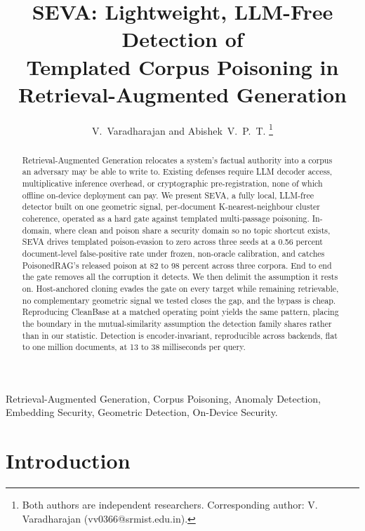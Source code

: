 \documentclass[10pt,journal,compsoc]{IEEEtran}
\begin{document}
\title{SEVA: Lightweight, LLM-Free Detection of\\
Templated Corpus Poisoning in\\
Retrieval-Augmented Generation}

\author{V.~Varadharajan and Abishek~V.~P.~T.%
\thanks{Both authors are independent researchers. Corresponding author: V. Varadharajan (vv0366@srmist.edu.in).}}

\maketitle

\begin{abstract}
Retrieval-Augmented Generation relocates a system's factual authority into a corpus an
adversary may be able to write to. Existing defenses require
LLM decoder access, multiplicative inference overhead, or cryptographic
pre-registration, none of which offline on-device deployment can pay. We present SEVA,
a fully local, LLM-free detector built on one geometric signal, per-document
K-nearest-neighbour cluster coherence, operated as a hard gate against templated
multi-passage poisoning. In-domain, where clean and poison share a security domain so
no topic shortcut exists, SEVA drives templated poison-evasion to zero across three
seeds at a 0.56 percent document-level false-positive rate under frozen, non-oracle
calibration, and catches PoisonedRAG's released poison at 82 to 98 percent across three
corpora. End to end the gate removes all the corruption it detects. We then delimit the
assumption it rests on. Host-anchored cloning evades the gate on every target while
remaining retrievable, no complementary geometric signal we tested closes the gap, and
the bypass is cheap. Reproducing CleanBase at a matched operating point yields
the same pattern, placing the boundary in the mutual-similarity assumption the
detection family shares rather than in our statistic. Detection is encoder-invariant,
reproducible across backends, flat to one million documents, at 13 to 38 milliseconds
per query.
\end{abstract}

\begin{IEEEkeywords}
Retrieval-Augmented Generation, Corpus Poisoning, Anomaly Detection, Embedding
Security, Geometric Detection, On-Device Security.
\end{IEEEkeywords}

\section{Introduction}
\end{document}
